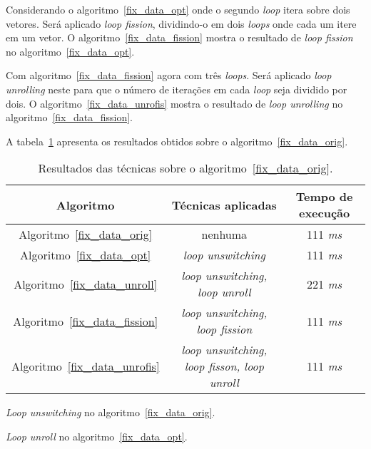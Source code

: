 Considerando o algoritmo~\ref{fix_data_opt} onde o segundo \textit{loop} itera
sobre dois vetores. Será aplicado \textit{loop fission}, dividindo-o em dois 
\textit{loops} onde cada um itere em um vetor.
O algoritmo~\ref{fix_data_fission} mostra o resultado de \textit{loop fission}
no algoritmo~\ref{fix_data_opt}.

Com algoritmo~\ref{fix_data_fission} agora com três \textit{loops}. Será
aplicado \textit{loop unrolling} neste para que o número de iterações em cada
\textit{loop} seja dividido por dois. 
O algoritmo~\ref{fix_data_unrofis} mostra o resultado de \textit{loop unrolling}
no algoritmo~\ref{fix_data_fission}.

A tabela~\ref{tabela_fix_data} apresenta os resultados obtidos sobre o
algoritmo~\ref{fix_data_orig}.

\begin{table}[H]
  \caption{Resultados das técnicas sobre o algoritmo~\ref{fix_data_orig}.}
  \label{tabela_fix_data}
\begin{center}
  \begin{tabular}{c|c|c}
    Algoritmo & Técnicas aplicadas & Tempo de execução\\
    \hline
    Algoritmo~\ref{fix_data_orig} & nenhuma & 111 \textit{ms} \\
    \hline
    Algoritmo~\ref{fix_data_opt} & \textit{loop unswitching} & 111 \textit{ms} \\
    \hline
    Algoritmo~\ref{fix_data_unroll} & \textit{loop unswitching, loop unroll} & 221 \textit{ms} \\
    \hline
    Algoritmo~\ref{fix_data_fission} & \textit{loop unswitching, loop fission} & 111 \textit{ms} \\
    \hline
  Algoritmo~\ref{fix_data_unrofis} & \textit{loop unswitching, loop fisson, loop unroll} & 111 \textit{ms} \\
    \hline
  \end{tabular}
\end{center}
\end{table}



\begin{algorithm}[H]
  \caption{\textit{Loop unswitching} no algoritmo~\ref{fix_data_orig}.}
    \label{fix_data_opt}

\end{algorithm}

\begin{algorithm}[H]
  \caption{\textit{Loop unroll} no algoritmo~\ref{fix_data_opt}.}
    \label{fix_data_unroll}

\end{algorithm}

